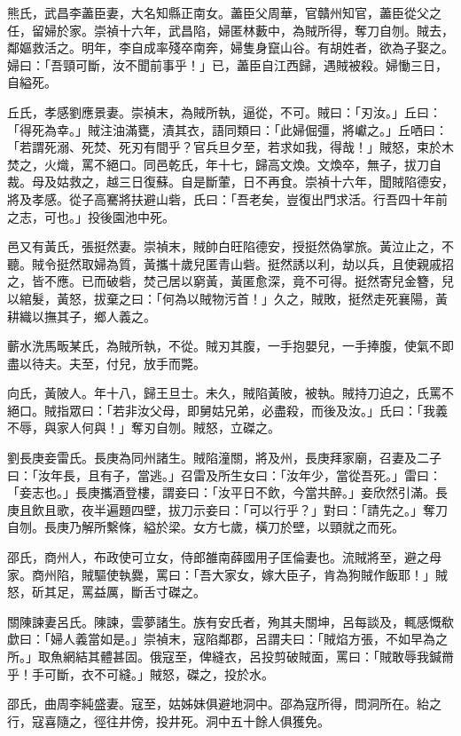 \begin{pinyinscope}
熊氏，武昌李藎臣妻，大名知縣正南女。藎臣父周華，官贛州知官，藎臣從父之任，留婦於家。崇禎十六年，武昌陷，婦匿林藪中，為賊所得，奪刀自刎。賊去，鄰嫗救活之。明年，李自成率殘卒南奔，婦隻身竄山谷。有胡姓者，欲為子娶之。婦曰：「吾頸可斷，汝不聞前事乎！」已，藎臣自江西歸，遇賊被殺。婦慟三日，自縊死。

丘氏，孝感劉應景妻。崇禎末，為賊所執，逼從，不可。賊曰：「刃汝。」丘曰：「得死為幸。」賊注油滿甕，漬其衣，語同類曰：「此婦倔彊，將巘之。」丘哂曰：「若謂死溺、死焚、死刃有間乎？官兵旦夕至，若求如我，得哉！」賊怒，束於木焚之，火熾，罵不絕口。同邑乾氏，年十七，歸高文煥。文煥卒，無子，拔刀自裁。母及姑救之，越三日復蘇。自是斷葷，日不再食。崇禎十六年，聞賊陷德安，將及孝感。從子高騫將扶避山砦，氏曰：「吾老矣，豈復出門求活。行吾四十年前之志，可也。」投後園池中死。

邑又有黃氏，張挺然妻。崇禎末，賊帥白旺陷德安，授挺然偽掌旅。黃泣止之，不聽。賊令挺然取婦為質，黃攜十歲兒匿青山砦。挺然誘以利，劫以兵，且使親戚招之，皆不應。已而破砦，焚己居以窮黃，黃匿愈深，竟不可得。挺然寄兒金簪，兒以綰髮，黃怒，拔棄之曰：「何為以賊物污首！」久之，賊敗，挺然走死襄陽，黃耕織以撫其子，鄉人義之。

蘄水洗馬畈某氏，為賊所執，不從。賊刃其腹，一手抱嬰兒，一手捧腹，使氣不即盡以待夫。夫至，付兒，放手而斃。

向氏，黃陂人。年十八，歸王旦士。未久，賊陷黃陂，被執。賊持刀迫之，氏罵不絕口。賊指眾曰：「若非汝父母，即舅姑兄弟，必盡殺，而後及汝。」氏曰：「我義不辱，與家人何與！」奪刃自刎。賊怒，立磔之。

劉長庚妾雷氏。長庚為同州諸生。賊陷潼關，將及州，長庚拜家廟，召妻及二子曰：「汝年長，且有子，當逃。」召雷及所生女曰：「汝年少，當從吾死。」雷曰：「妾志也。」長庚攜酒登樓，謂妾曰：「汝平日不飲，今當共醉。」妾欣然引滿。長庚且飲且歌，夜半遍題四壁，拔刀示妾曰：「可以行乎？」對曰：「請先之。」奪刀自刎。長庚乃解所繫條，縊於梁。女方七歲，橫刀於壁，以頸就之而死。

邵氏，商州人，布政使可立女，侍郎雒南薛國用子匡倫妻也。流賊將至，避之母家。商州陷，賊驅使執爨，罵曰：「吾大家女，嫁大臣子，肯為狗賊作飯耶！」賊怒，斫其足，罵益厲，斷舌寸磔之。

關陳諫妻呂氏。陳諫，雲夢諸生。族有安氏者，殉其夫關坤，呂每談及，輒感慨欷歔曰：「婦人義當如是。」崇禎末，寇陷鄰郡，呂謂夫曰：「賊焰方張，不如早為之所。」取魚網結其體甚固。俄寇至，俾縫衣，呂投剪破賊面，罵曰：「賊敢辱我鍼黹乎！手可斷，衣不可縫。」賊怒，磔之，投於水。

邵氏，曲周李純盛妻。寇至，姑姊妹俱避地洞中。邵為寇所得，問洞所在。紿之行，寇喜隨之，徑往井傍，投井死。洞中五十餘人俱獲免。


\end{pinyinscope}
